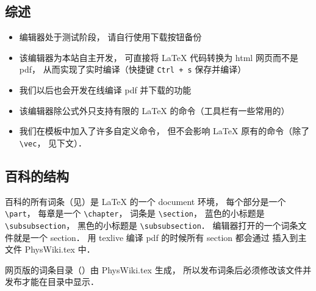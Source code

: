 
\subsection{综述}
\begin{itemize}
\item 编辑器处于测试阶段， 请自行使用下载按钮备份
\item 该编辑器为本站自主开发， 可直接将 LaTeX 代码转换为 html 网页而不是 pdf， 从而实现了实时编译（快捷键 \lstinline|Ctrl + s| 保存并编译）
\item 我们以后也会开发在线编译 pdf 并下载的功能
\item 该编辑器除公式外只支持有限的 LaTeX 的命令（工具栏有一些常用的）
\item 我们在模板中加入了许多自定义命令， 但不会影响 LaTeX 原有的命令（除了 \lstinline|\vec|， 见下文）．
\end{itemize}

\subsection{百科的结构}

百科的所有词条（见）是 LaTeX 的一个 document 环境， 每个部分是一个 \lstinline|\part|， 每章是一个 \lstinline|\chapter|， 词条是 \lstinline|\section|， 蓝色的小标题是 \lstinline|\subsubsection|， 黑色的小标题是 \lstinline|\subsubsection|． 编辑器打开的一个词条文件就是一个 section． 用 texlive 编译 pdf 的时候所有 section 都会通过 \lstinline|| 插入到主文件 PhysWiki.tex 中．

网页版的词条目录（）由 PhysWiki.tex 生成， 所以发布词条后必须修改该文件并发布才能在目录中显示．

